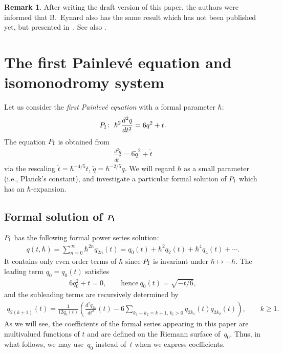 \documentclass[pdftex]{sigma}
\theoremstyle{definition}
\newtheorem{rem}[thm]{Remark}
\numberwithin{equation}{section}
\def\PI{P_{\rm I}}
\begin{document}
\begin{rem}
After writing the draft version of this paper,
the authors were informed that B.~Eynard also
has the same result which has not been published yet,
but presented in~\cite{Eynard14}.
See also \cite[Chapter~5]{Eynard-book}.
\end{rem}


\section{The f\/irst Painlev\'e equation and isomonodromy system}\label{section2}


Let us consider the {\em first Painlev\'e equation}
with a formal parameter $\hbar$:
\begin{gather*}
\PI\colon \
\hbar^{2} \frac{d^{2}q}{dt^{2}} = 6q^{2} + t.
\end{gather*}
The equation $\PI$ is obtained from
\begin{gather*}
\frac{d^{2} \tilde{q}}{d\tilde{t}^{2}} =
6 \tilde{q}^{2} + \tilde{t}
\end{gather*}
via the rescaling
$\tilde{t} = \hbar^{-4/5} t$,
$\tilde{q} = \hbar^{-2/5} q$.
We will regard $\hbar$ as a small parameter (i.e., Planck's constant),
and investigate a particular formal solution
of $\PI$ which has an $\hbar$-expansion.

\subsection[Formal solution of $\PI$]{Formal solution of $\boldsymbol{\PI}$}

$\PI$ has the following formal power series solution:
\begin{gather} \label{eq:formal-q}
q(t,\hbar) = \sum_{n=0}^{\infty} \hbar^{2n}q_{2n}(t)
= q_{0}(t) + \hbar^{2} q_{2}(t)
+ \hbar^{4} q_{4}(t) + \cdots.
\end{gather}
It contains only even order terms of $\hbar$ since $\PI$
is invariant under $\hbar \mapsto - \hbar$.
The leading term $q_{0} = q_{0}(t)$ satisf\/ies
\begin{gather} \label{eq:q0}
6q_{0}^{2} + t = 0, \qquad \text{hence}~q_{0}(t)=\sqrt{-t/6},
\end{gather}
and the subleading terms are recursively determined by
\begin{gather} \label{eq:recursion-q-2k}
q_{2(k+1)}(t) = \frac{1}{12 q_{0}(t)} \left(
\frac{d^{2} q_{2k}}{dt^{2}}(t)  -
6 \sum_{k_{1}+k_{2} = k+1,\,  k_{i}>0} q_{2k_{1}}(t) q_{2k_{2}}(t)
\right), \qquad k \ge 1.
\end{gather}
As we will see, the coef\/f\/icients of the formal series appearing in
this paper are multivalued functions of $t$ and are def\/ined
on the Riemann surface of~$q_{0}$. Thus, in what follows,
we may use~$q_{0}$ instead of~$t$ when we express coef\/f\/icients.
\end{document}
